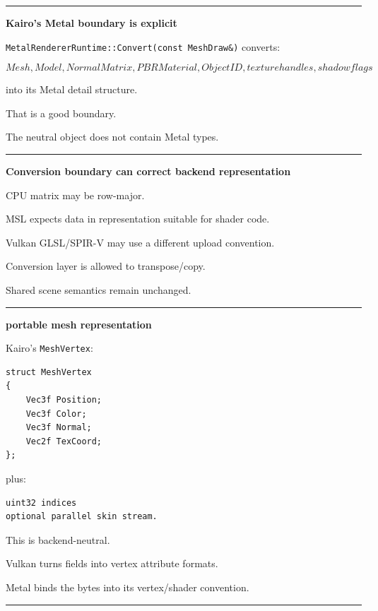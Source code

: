 \begin{center}\rule{0.5\linewidth}{0.5pt}\end{center}

\textbf{Kairo's Metal boundary is explicit}

\texttt{MetalRendererRuntime::Convert(const\ MeshDraw\&)} converts:

\[
Mesh,
Model,
NormalMatrix,
PBRMaterial,
ObjectID,
texture handles,
shadow flags
\]

into its Metal detail structure.

That is a good boundary.

The neutral object does not contain Metal types.

\begin{center}\rule{0.5\linewidth}{0.5pt}\end{center}

\textbf{Conversion boundary can correct backend representation}

CPU matrix may be row-major.

MSL expects data in representation suitable for shader code.

Vulkan GLSL/SPIR-V may use a different upload convention.

Conversion layer is allowed to transpose/copy.

Shared scene semantics remain unchanged.

\begin{center}\rule{0.5\linewidth}{0.5pt}\end{center}

\textbf{portable mesh representation}

Kairo's \texttt{MeshVertex}:

\begin{verbatim}
struct MeshVertex
{
    Vec3f Position;
    Vec3f Color;
    Vec3f Normal;
    Vec2f TexCoord;
};
\end{verbatim}

plus:

\begin{verbatim}
uint32 indices
optional parallel skin stream.
\end{verbatim}

This is backend-neutral.

Vulkan turns fields into vertex attribute formats.

Metal binds the bytes into its vertex/shader convention.

\begin{center}\rule{0.5\linewidth}{0.5pt}\end{center}

